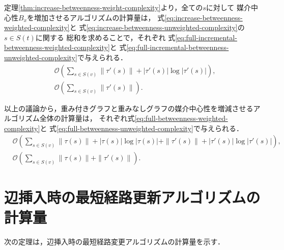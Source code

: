 定理\ref{thm:increase-betweenness-weight-complexity}より，全ての$s$に対して
媒介中心性$B_x$を増加させるアルゴリズムの計算量は，
式\eqref{eq:increase-betweenness-weighted-complexity}と
式\eqref{eq:increase-betweenness-unweighted-complexity}の$s\in S(t)$に関する
総和を求めることで，それぞれ
式\eqref{eq:full-incremental-betweenness-weighted-complexity}と
式\eqref{eq:full-incremental-betweenness-unweighted-complexity}で与えられる．
\begin{align}
  &\mathcal{O}\left(\sum_{s\in S(v)}\|\tau'(s)\|+|\tau'(s)|\log|\tau'(s)|\right),
  \label{eq:full-incremental-betweenness-weighted-complexity} \\
  &\mathcal{O}\left(\sum_{s\in S(v)}\|\tau'(s)\|\right).
  \label{eq:full-incremental-betweenness-unweighted-complexity}
\end{align}

以上の議論から，重み付きグラフと重みなしグラフの媒介中心性を増減させるアルゴリズム全体の計算量は，
それぞれ式\eqref{eq:full-betweenness-weighted-complexity}と
式\eqref{eq:full-betweenness-unweighted-complexity}で与えられる．
\begin{align}
  &\mathcal{O}\left(\sum_{s\in S(v)}\|\tau(s)\|+|\tau(s)|\log|\tau(s)|+\|\tau'(s)\|+|\tau'(s)|\log|\tau'(s)|\right),
  \label{eq:full-betweenness-weighted-complexity} \\
  &\mathcal{O}\left(\sum_{s\in S(v)}\|\tau(s)\|+\|\tau'(s)\|\right).
  \label{eq:full-betweenness-unweighted-complexity}
\end{align}

\section{辺挿入時の最短経路更新アルゴリズムの計算量}
次の定理は，辺挿入時の最短経路変更アルゴリズムの計算量を示す．


